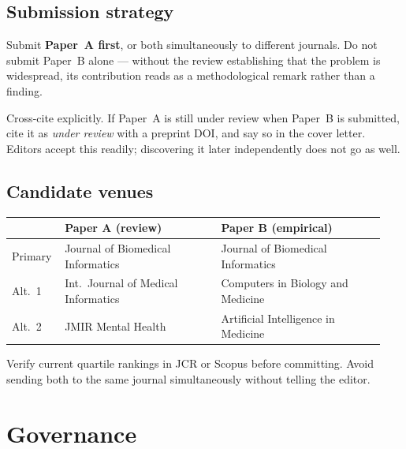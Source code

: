 \documentclass[11pt,a4paper]{article}
\begin{document}
\subsection{Submission strategy}

Submit \textbf{Paper~A first}, or both simultaneously to different journals.
Do not submit Paper~B alone --- without the review establishing that the
problem is widespread, its contribution reads as a methodological remark
rather than a finding.

Cross-cite explicitly. If Paper~A is still under review when Paper~B is
submitted, cite it as \emph{under review} with a preprint DOI, and say so
in the cover letter. Editors accept this readily; discovering it later
independently does not go as well.

\subsection{Candidate venues}

\begin{center}
\footnotesize
\setlength{\tabcolsep}{6pt}
\renewcommand{\arraystretch}{1.25}
\begin{tabular}{@{}p{0.12\linewidth}p{0.40\linewidth}p{0.42\linewidth}@{}}
\toprule
& \textbf{Paper A (review)} & \textbf{Paper B (empirical)}\\
\midrule
Primary & Journal of Biomedical Informatics & Journal of Biomedical Informatics\\
Alt.\ 1 & Int.\ Journal of Medical Informatics & Computers in Biology and Medicine\\
Alt.\ 2 & JMIR Mental Health & Artificial Intelligence in Medicine\\
\bottomrule
\end{tabular}
\end{center}

Verify current quartile rankings in JCR or Scopus before committing. Avoid
sending both to the same journal simultaneously without telling the editor.

\section{Governance}
\end{document}

